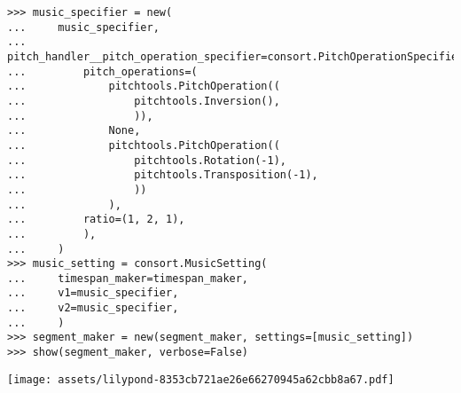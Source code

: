 \begin{comment}
<abjad>[stylesheet=../consort.ily]
music_specifier = new(
    music_specifier,
    pitch_handler__pitch_operation_specifier=consort.PitchOperationSpecifier(
        pitch_operations=(
            pitchtools.PitchOperation((
                pitchtools.Inversion(),
                )),
            None,
            pitchtools.PitchOperation((
                pitchtools.Rotation(-1),
                pitchtools.Transposition(-1),
                ))
            ),
        ratio=(1, 2, 1),
        ),
    )
music_setting = consort.MusicSetting(
    timespan_maker=timespan_maker,
    v1=music_specifier,
    v2=music_specifier,
    )
segment_maker = new(segment_maker, settings=[music_setting])
show(segment_maker, verbose=False)
</abjad>
\end{comment}

\begin{singlespacing}
\vspace{-0.5\baselineskip}
\begin{lstlisting}
>>> music_specifier = new(
...     music_specifier,
...     pitch_handler__pitch_operation_specifier=consort.PitchOperationSpecifier(
...         pitch_operations=(
...             pitchtools.PitchOperation((
...                 pitchtools.Inversion(),
...                 )),
...             None,
...             pitchtools.PitchOperation((
...                 pitchtools.Rotation(-1),
...                 pitchtools.Transposition(-1),
...                 ))
...             ),
...         ratio=(1, 2, 1),
...         ),
...     )
>>> music_setting = consort.MusicSetting(
...     timespan_maker=timespan_maker,
...     v1=music_specifier,
...     v2=music_specifier,
...     )
>>> segment_maker = new(segment_maker, settings=[music_setting])
>>> show(segment_maker, verbose=False)
\end{lstlisting}
\noindent\texttt{[image: assets/lilypond-8353cb721ae26e66270945a62cbb8a67.pdf]}
\end{singlespacing}

\begin{comment}
<abjad>[stylesheet=../consort.ily]
music_specifier = new(
    music_specifier,
    pitch_handler__forbid_repetitions=True,
    )
music_setting = consort.MusicSetting(
    timespan_maker=timespan_maker,
    v1=music_specifier,
    v2=music_specifier,
    )
segment_maker = new(segment_maker, settings=[music_setting])
show(segment_maker, verbose=False)
</abjad>
\end{comment}

